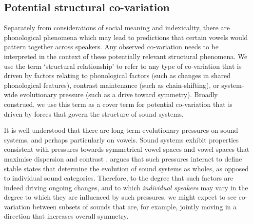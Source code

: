 \documentclass[review]{elsarticle} %
\begin{document}
\subsection{Potential structural co-variation}\label{sec:phon}
Separately from considerations of social meaning and indexicality, there are phonological phenomena which may lead to predictions that certain vowels would pattern together across speakers. Any observed co-variation needs to be interpreted in the context of these potentially relevant structural phenomena.  We use the term `structural relationship' to refer to any type of co-variation that is driven by factors relating to phonological factors (such as changes in shared phonological features), contrast maintenance (such as chain-shifting), or system-wide evolutionary pressure (such as a drive toward symmetry).  Broadly construed, we use this term as a cover term for potential co-variation that is driven by forces that govern the structure of sound systems.

It is well understood that there are long-term evolutionary pressures on sound systems, and perhaps particularly on vowels.  Sound systems exhibit properties consistent with pressures towards symmetrical vowel spaces \citep{boersma1998functional} and vowel spaces that maximise dispersion and contrast \citep{martinet1952function, moulton1962dialect, liljencrants1972numerical, schwartz1997major}. \citet{soskuthy15} argues that such pressures interact to define stable states that determine the evolution of sound systems as wholes, as opposed to individual sound categories. Therefore, to the degree that such factors are indeed driving ongoing changes, and to which {\em individual speakers} may vary in the degree to which they are influenced by such pressures, we might expect to see co-variation between subsets of sounds that are, for example, jointly moving in a direction that increases overall symmetry.
\end{document}
